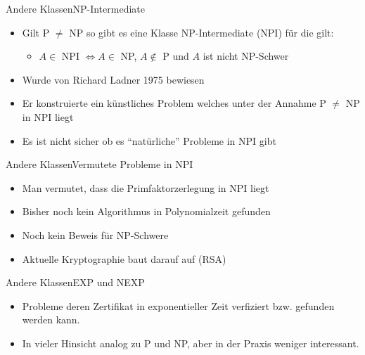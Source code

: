\documentclass[ignorenonframetext,]{beamer}
\begin{document}
\begin{frame}{Andere Klassen}{NP-Intermediate}
\begin{itemize}
\itemsep1pt\parskip0pt
\item
  Gilt P $\neq$ NP so gibt es eine Klasse NP-Intermediate (NPI) für die
  gilt:

  \begin{itemize}
  \itemsep1pt\parskip0pt
  \item
    $A \in$ NPI $\Leftrightarrow A \in$ NP, $A \notin$ P und $A$ ist
    nicht NP-Schwer
  \end{itemize}
\item
  Wurde von Richard Ladner 1975 bewiesen
\item
  Er konstruierte ein künstliches Problem welches unter der Annahme P
  $\neq$ NP in NPI liegt
\item
  Es ist nicht sicher ob es ``natürliche'' Probleme in NPI gibt
\end{itemize}
\end{frame}

\begin{frame}{Andere Klassen}{Vermutete Probleme in NPI}
\begin{itemize}
\itemsep1pt\parskip0pt
\item
  Man vermutet, dass die Primfaktorzerlegung in NPI liegt
\item
  Bisher noch kein Algorithmus in Polynomialzeit gefunden
\item
  Noch kein Beweis für NP-Schwere
\item
  Aktuelle Kryptographie baut darauf auf (RSA)
\end{itemize}
\end{frame}



\begin{frame}{Andere Klassen}{EXP und NEXP}

\begin{itemize}
\itemsep1pt\parskip0pt
\item
  Probleme deren Zertifikat in exponentieller Zeit verfiziert bzw.
  gefunden werden kann.
\item
  In vieler Hinsicht analog zu P und NP, aber in der Praxis weniger
  interessant.
\end{itemize}

\end{frame}
\end{document}
